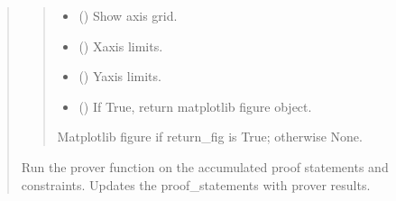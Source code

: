 \documentclass[letterpaper,10pt,english]{sphinxmanual}
\begin{document}
\begin{quote}
\begin{fulllineitems}
\begin{fulllineitems}
\begin{quote}
\begin{description}
\begin{itemize}
\item {} 
\sphinxAtStartPar
{} () \textendash{} Show axis grid.

\item {} 
\sphinxAtStartPar
{} (\sphinxstyleliteralemphasis{\sphinxupquote{{[}}}\sphinxstyleliteralemphasis{\sphinxupquote{, }}\sphinxstyleliteralemphasis{\sphinxupquote{{]} }}\sphinxstyleliteralemphasis{\sphinxupquote{| }}) \textendash{} X\sphinxhyphen{}axis limits.

\item {} 
\sphinxAtStartPar
{} (\sphinxstyleliteralemphasis{\sphinxupquote{{[}}}\sphinxstyleliteralemphasis{\sphinxupquote{, }}\sphinxstyleliteralemphasis{\sphinxupquote{{]} }}\sphinxstyleliteralemphasis{\sphinxupquote{| }}) \textendash{} Y\sphinxhyphen{}axis limits.

\item {} 
\sphinxAtStartPar
{} () \textendash{} If True, return matplotlib figure object.

\end{itemize}

\sphinxAtStartPar
Matplotlib figure if return\_fig is True; otherwise None.

\end{description}\end{quote}

\end{fulllineitems}


\begin{fulllineitems}
\label{\detokenize{pygeox:pygeox.geoscene.GeoScene.prove}}
\pysigstartsignatures
\pysiglinewithargsret
{}
{}
{}
\pysigstopsignatures
\sphinxAtStartPar
Run the prover function on the accumulated proof statements and constraints.
Updates the proof\_statements with prover results.


\end{fulllineitems}
\end{fulllineitems}
\end{quote}
\end{document}
